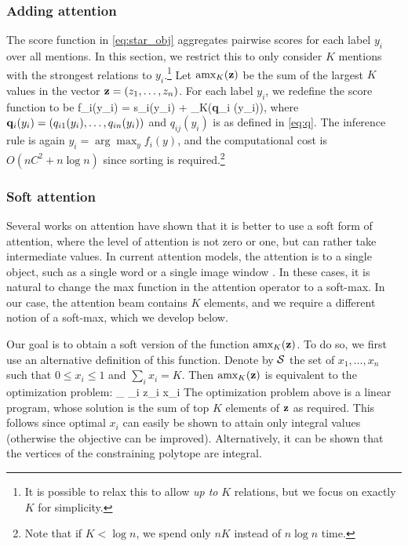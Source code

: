 \subsubsection{Adding attention \label{sec:add_attention}}
The score function in \eqref{eq:star_obj} aggregates pairwise scores for each label $y_i$ over all mentions. In this section, we restrict this to only consider $K$ mentions with the strongest relations to $y_i$.\footnote{It is possible to relax this to allow {\em up to} $K$ relations, but we focus on exactly $K$ for simplicity.} 
  Let $\text{amx}_K({\bf z})$  be the sum of the largest $K$ values in the vector
${\bf z} = (z_1,\ldots,z_n)$.  For each label $y_i$,
we redefine the score function to be
\be
f_i(y_i) = s_i(y_i) + \amax_K({\bf q}_i (y_i)),
\label{eq:amax_obj}
\ee
where ${\bf q}_i(y_i) = (q_{i1}(y_i), \ldots, q_{in}(y_i))$ and $q_{ij}(y_i)$ is as defined in \eqref{eq:q}.
The inference rule is again $y_i = \arg\max_y f_i(y)$, and the computational cost is $O(nC^2+ n\log{n})$ since sorting is required.\footnote{Note that if $K < \log{n}$, we spend only $nK$ instead of $n\log{n}$ time.}


\subsubsection{Soft attention}
\label{sec:soft_attention}

Several works on attention have shown that it is better to use a soft form of attention, where the level of attention is not zero or one, but can rather take intermediate values. In current attention models, the attention is to a single object, such as a single word \cite{bahdanau2014neural} or a single image window \cite{xu2015show}. In these cases, it is natural to change the max function in the attention operator to a soft-max. In our case, the attention beam contains $K$ elements, and we require a different notion of a soft-max, which we develop below.

\newcommand{\cS}{{\cal S}}
\newcommand{\xx}{{\mathbf{x}}}
Our goal is to obtain a soft version of the function  $\text{amx}_K({\bf z})$. To do so, we first use an alternative definition of this function. Denote by $\cS$
the set of $x_1,\ldots,x_n$ such that $0\leq x_i \leq 1$ and $\sum_i x_i = K$. Then $\text{amx}_K({\bf z})$ is equivalent to the optimization problem:
\be
 \max_{ 
 \xx \in \cS
 } \sum_i z_i x_i
\ee
The optimization problem above is a linear program, whose solution is the sum of top $K$ elements of ${\bf z}$ as required. This follows since optimal $x_i$ can easily be shown to attain only integral values (otherwise the objective can be improved). Alternatively, it can be shown that the vertices of the constraining polytope are integral.

